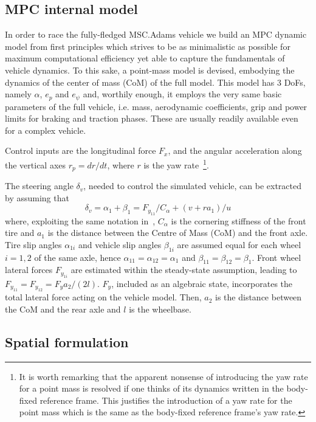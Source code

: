 \documentclass[conference]{IEEEtran} %
\begin{document}
\subsection{MPC internal model}

In order to race the fully-fledged MSC.Adams vehicle we build an MPC dynamic model from first principles which strives to be as minimalistic as possible for maximum computational efficiency yet able to capture the fundamentals of vehicle dynamics. To this sake, a point-mass model is devised, embodying the dynamics of the center of mass (CoM) of the full model.
This model has 3 DoFs, namely $\alpha$, $e_p$ and $e_{\psi}$ and, worthily enough, it employs the very same basic parameters of the full vehicle, i.e. mass, aerodynamic coefficients, grip and power limits for braking and traction phases. These are usually readily available even for a complex vehicle.

Control inputs are the longitudinal force $F_{x}$, and the angular acceleration along the vertical axes $r_p = dr/dt$, where $r$ is the yaw rate~\footnote{It is worth remarking that the apparent nonsense of introducing the yaw rate for a point mass is resolved if one thinks of its dynamics written in the body-fixed reference frame. This justifies the introduction of a yaw rate for the point mass which is the same as the body-fixed reference frame's yaw rate.}.

The steering angle $\delta_v$, needed to control the simulated vehicle, can be extracted by assuming that
\begin{equation}
\delta_v = \alpha_{1} + \beta_1 = F_{y_{11}}/C_\alpha + (v + ra_1)/u
\end{equation}
where, exploiting the same notation in~\cite{Guiggiani2018}, $C_\alpha$ is the cornering stiffness of the front tire and $a_1$ is the distance between the Centre of Mass (CoM) and the front axle.
Tire slip angles $\alpha_{1i}$ and vehicle slip angles $\beta_{1i}$ are assumed equal for each wheel $i=1, 2$ of the same axle, hence $\alpha_{11} = \alpha_{12} = \alpha_{1}$ and $\beta_{11} = \beta_{12} = \beta_{1}$.
%
Front wheel lateral forces $F_{y_{1i}}$ are estimated within the steady-state assumption, leading to $F_{y_{11}} = F_{y_{12}} = F_{y}a_2/(2l)$.
$F_{y}$, included as an algebraic state, incorporates the total lateral force acting on the vehicle model. Then, $a_2$ is the distance between the CoM and the rear axle and $l$ is the wheelbase.

\subsection{Spatial formulation}
\end{document}
